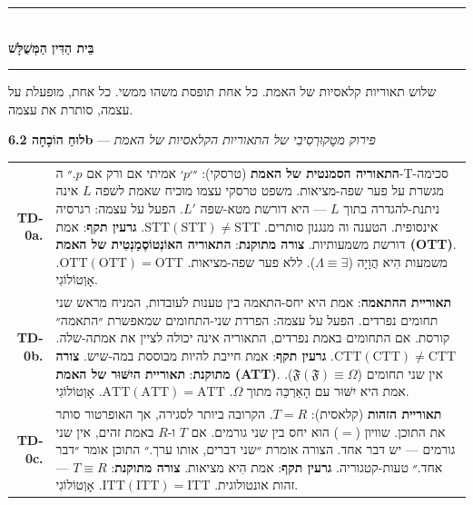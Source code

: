 \documentclass[10pt, openany, oneside]{book}
\renewcommand{\normalsize}{\fontsize{10}{13}\selectfont}
\renewcommand{\footnotesize}{\fontsize{8.5}{11}\selectfont}
\begin{document}
\begin{center}
    \rule{0.3\textwidth}{0.4pt}\\[0.5em]
    {\normalsize\bfseries\textsc{בֵּית הַדִּין הַמְּשֻׁלָּשׁ}}\\[0.3em]
    \rule{0.3\textwidth}{0.4pt}
\end{center}

\vspace{1em}

\noindent שלוש תאוריות קלאסיות של האמת. כל אחת תופסת משהו ממשי. כל אחת, מופעלת על עצמה, סותרת את עצמה.

\vspace{0.5em}

\textbf{לוּחַ הוֹכָחָה 6.2b} --- \textit{פירוק מטָקוּרְסִיבִי של התאוריות הקלאסיות של האמת}

\vspace{0.5em}

{\footnotesize
\noindent\begin{tabular}{r p{}}
\textbf{TD-0a.} & \textbf{התאוריה הסמנטית של האמת} (טרסקי): ״׳$p$׳ אמיתי אם ורק אם $p$.״ ה-T-סכימה מגשרת על פער שפה-מציאות. משפט טרסקי עצמו מוכיח שאמת לשפה $L$ אינה ניתנת-להגדרה בתוך $L$ — היא דורשת מטא-שפה $L'$. הפעל על עצמה: רגרסיה אינסופית. הטענה וה מנגנון סותרים. $\text{STT}(\text{STT}) \neq \text{STT}$. \textbf{גרעין תקף}: אמת דורשת משמעותיות. \textbf{צורה מתוקנת}: \textbf{התאוריה האוֹנְטוֹסֶמַנְטִית של האמת (OTT)}. משמעות הִיא הֲוָיָה ($\Lambda \equiv \exists$). ללא פער שפה-מציאות. $\text{OTT}(\text{OTT}) = \text{OTT}$. אָוְטוֹלוֹגִי. \\[0.5em]
\textbf{TD-0b.} & \textbf{תאוריית ההתאמה}: אמת היא יחס-התאמה בין טענות לעובדות, המניח מראש שני תחומים נפרדים. הפעל על עצמה: הפרדת שני-התחומים שמאפשרת ״התאמה״ קורסת. אם התחומים באמת נפרדים, התאוריה אינה יכולה לציין את אמתה-שלה. $\text{CTT}(\text{CTT}) \neq \text{CTT}$. \textbf{גרעין תקף}: אמת חייבת להיות מבוססת במה-שיש. \textbf{צורה מתוקנת}: \textbf{תאוריית היִשּׁוּר של האמת (ATT)}. אין שני תחומים ($\mathfrak{F}(\mathfrak{F}) \equiv \Omega$). אמת היא יִשּׁוּר עם הָאַרְכֵּה מתוך $\Omega$. $\text{ATT}(\text{ATT}) = \text{ATT}$. אָוְטוֹלוֹגִי. \\[0.5em]
\textbf{TD-0c.} & \textbf{תאוריית הזהות} (קלאסית): $T = R$. הקרובה ביותר לסגירה, אך האופרטור סותר את התוכן. שוויון ($=$) הוא יחס בין שני גורמים. אם $T$ ו-$R$ באמת זהים, אין שני גורמים — יש דבר אחד. הצורה אומרת ״שני דברים, אותו ערך.״ התוכן אומר ״דבר אחד.״ טעות-קטגוריה. \textbf{גרעין תקף}: אמת הִיא מציאות. \textbf{צורה מתוקנת}: $T \equiv R$ — זהות אונטולוגית. $\text{ITT}(\text{ITT}) = \text{ITT}$. אָוְטוֹלוֹגִי. \\[0.3em]
\end{tabular}
}
\end{document}
